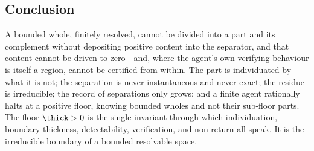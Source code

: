 \subsection{Conclusion}

A bounded whole, finitely resolved, cannot be divided into a part and its
complement without depositing positive content into the separator, and that
content cannot be driven to zero---and, where the agent's own verifying behaviour
is itself a region, cannot be certified from within. The part is
individuated by what it is not; the separation is never instantaneous and never
exact; the residue is irreducible; the record of separations only grows; and a
finite agent rationally halts at a positive floor, knowing bounded wholes and not
their sub-floor parts. The floor $\thick>0$ is the single invariant through which
individuation, boundary thickness, detectability, verification, and non-return
all speak. It is the irreducible boundary of a bounded resolvable space.





